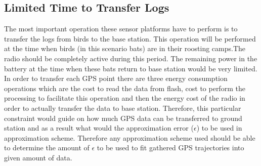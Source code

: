 \documentclass[conference]{IEEEtran}
\begin{document}
\subsection{Limited Time to Transfer Logs} \label{limited-time}
The most important operation these sensor platforms have to perform is to transfer the logs from birds to the 
base station. This operation will be performed at the time when birds (in this scenario bats) are in their 
roosting camps.The radio should be completely active during this period. The remaining power in the battery 
at the time when these bats return to base station would be very limited. In order to transfer each GPS point 
there are three energy consumption operations which are the cost to read the data from flash, cost to perform 
the processing to facilitate this operation and then the energy cost of the radio in order to actually transfer 
the data to base station. Therefore, this particular constraint would guide on how much GPS data can be 
transferred to ground station and as a result what would the approximation error ($\epsilon$) to be used in 
approximation scheme. Therefore any approximation scheme used should be able to determine the amount of $\epsilon$ 
to be used to fit gathered GPS trajectories into given amount of data.\
%
%
\end{document}
